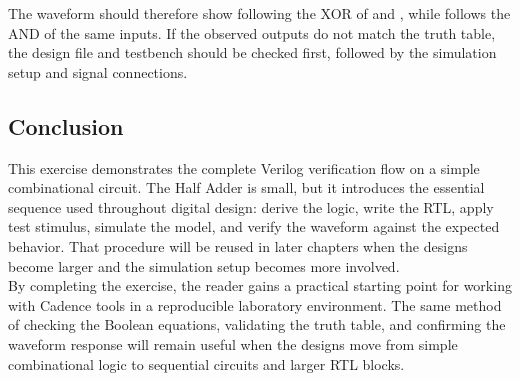 \noindent The waveform should therefore show  following the XOR of  and
, while  follows the AND of the same inputs. If the observed outputs
do not match the truth table, the design file and testbench should be checked first, followed by the
simulation setup and signal connections.

\subsection{Conclusion}
This exercise demonstrates the complete Verilog verification flow on a simple combinational circuit.
The Half Adder is small, but it introduces the essential sequence used throughout digital design:
derive the logic, write the RTL, apply test stimulus, simulate the model, and verify the waveform
against the expected behavior. That procedure will be reused in later chapters when the designs
become larger and the simulation setup becomes more involved.\\

\noindent By completing the exercise, the reader gains a practical starting point for working with
Cadence tools in a reproducible laboratory environment. The same method of checking the Boolean
equations, validating the truth table, and confirming the waveform response will remain useful when
the designs move from simple combinational logic to sequential circuits and larger RTL blocks.
